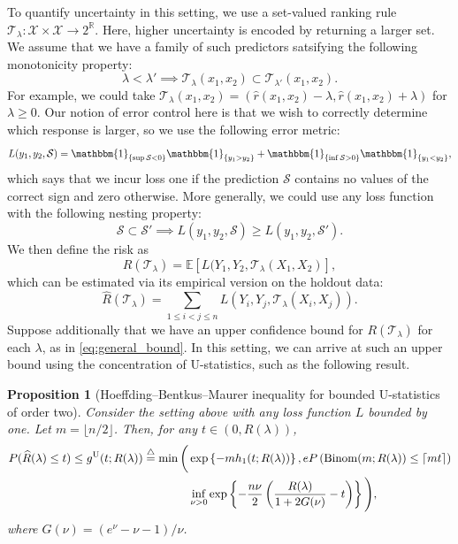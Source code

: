 \documentclass[10pt]{article}
\newtheorem{prop}{Proposition}
\def\R{\mathbb{R}}
\def\E{\mathbb{E}}
\newcommand{\X}{\mathcal{X}}
\newcommand{\T}{\mathcal{T}}
\renewcommand{\S}{\mathcal{S}}
\newcommand{\Rhat}{\widehat{R}}
\newcommand{\ind}[1]{\mathbbm{1}_{\left\{#1\right\}}}
\newcommand{\triangleq}{\stackrel{\triangle}{=}}
\begin{document}
To quantify uncertainty in this setting, we use a set-valued ranking rule $\T_\lambda : \X \times \X \to 2^ \R$. Here, higher uncertainty is encoded by returning a larger set. We assume that we have a family of such predictors satsifying the following monotonicity property:
\begin{equation}
\lambda < \lambda' \implies \T_\lambda(x_1, x_2) \subset \T_{\lambda'}(x_1, x_2).
\label{eq:ustat2_nested_predictions}
\end{equation}
For example, we could take $\T_\lambda(x_1, x_2) = (\hat{r}(x_1, x_2) - \lambda, \hat{r}(x_1, x_2) + \lambda)$ for $\lambda \ge 0$.
Our notion of error control here is that we wish to correctly determine which response is larger, so we use the following error metric:
\begin{equation*}
    L(y_1, y_2, \S) = \ind{\sup{\S} < 0}\ind{y_1 > y_2} + \ind{\inf{\S} > 0}\ind{y_1 < y_2},
\end{equation*}
which says that we incur loss one if the prediction $\S$ contains no values of the correct sign and zero otherwise. More generally, we could use any loss function with the following nesting property:
\begin{equation}
    \S \subset \S' \implies L(y_1, y_2, \S) \ge L(y_1, y_2, \S').
    \label{eq:ustat2_nested_loss}
\end{equation}
We then define the risk as 
\begin{equation}
R(\T_\lambda) = \E[L(Y_1, Y_2, \T_\lambda(X_1, X_2)],
\label{eq:ustat2_risk}
\end{equation}
which can be estimated via its empirical version on the holdout data:
\begin{equation}
\widehat{R}(\T_\lambda) = \sum_{1 \le i < j \le n} L(Y_i, Y_j, \T_\lambda(X_i, X_j)).
\label{eq:ustat2_emp_risk}
\end{equation}
Suppose additionally that we have an upper confidence bound for $R(\T_\lambda)$ for each $\lambda$, as in \eqref{eq:general_bound}. In this setting, we can arrive at such an upper bound using the concentration of U-statistics, such as the following result.
\begin{prop}[Hoeffding--Bentkus--Maurer inequality for bounded U-statistics of order two]
Consider the setting above with any loss function $L$ bounded by one. Let $m = \lfloor n / 2\rfloor$. Then, for any $t\in (0, R(\lambda))$,
\begin{align*}
P(\Rhat(\lambda)\le t) \le g^{{\rm U}}(t; R(\lambda)) \triangleq \min\bigg(& \exp\left\{-mh_1(t; R(\lambda))\right\}, eP\left({\rm Binom}(m; R(\lambda)) \leq \lceil mt\rceil\right)\nonumber\\
& \inf_{\nu > 0}\exp\left\{-\frac{n\nu}{2} \left(\frac{R(\lambda)}{1 + 2G(\nu)} - t\right)\right\}\Bigg),
\end{align*}
where $G(\nu) = (e^{\nu} - \nu - 1) / \nu$.
\label{prop:ustat2_ucb}
\end{prop}
\end{document}
